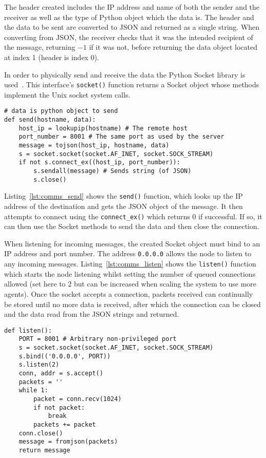 The header created includes the IP address and name of both the sender and the
receiver as well as the type of Python object which the data is. The header
and the data to be sent are converted to JSON and returned as a single
string. When converting from JSON, the receiver checks that it was the
intended recipient of the message, returning $-1$ if it was not, before
returning the data object located at index 1 (header is index 0). 

In order to physically send and receive the data the Python Socket library
is used~\cite{socketServerDocs}. This interface's \verb|socket()| function
returns a Socket object whose methods implement the Unix socket system calls.

\begin{lstlisting}[caption={send() Function}, label={lst:comms_send}]
# data is python object to send
def send(hostname, data):
    host_ip = lookupip(hostname) # The remote host
    port_number = 8001 # The same port as used by the server
    message = tojson(host_ip, hostname, data)
    s = socket.socket(socket.AF_INET, socket.SOCK_STREAM)
    if not s.connect_ex((host_ip, port_number)):
        s.sendall(message) # Sends string (of JSON)
        s.close()
\end{lstlisting}

Listing~\ref{lst:comms_send} shows the \verb|send()| function, which looks up the IP address of the destination and gets the JSON
object of the message. It then attempts to connect using the \verb|connect_ex()|
which returns 0 if successful. If so, it can then use the Socket methods to send
the data and then close the connection.

When listening for incoming messages, the created Socket object must bind to
an IP address and port number. The address \verb|0.0.0.0| allows the node to listen
to any incoming messages. Listing~\ref{lst:comms_listen} shows the \verb|listen()| function which starts the node listening
whilst setting the number of queued connections allowed (set here to 2 but can
be increased when scaling the system to use more agents). Once the socket
accepts a connection, packets received can continually be stored
until no more data is received, after which the connection can be closed and
the data read from the JSON strings and returned.

\begin{lstlisting}[caption={\texttt{listen()} function}, label={lst:comms_listen}]
def listen():
    PORT = 8001 # Arbitrary non-privileged port
    s = socket.socket(socket.AF_INET, socket.SOCK_STREAM)
    s.bind(('0.0.0.0', PORT))
    s.listen(2)
    conn, addr = s.accept()
    packets = ''
    while 1:
        packet = conn.recv(1024)
        if not packet:
            break
        packets += packet
    conn.close()
    message = fromjson(packets)
    return message
\end{lstlisting}

